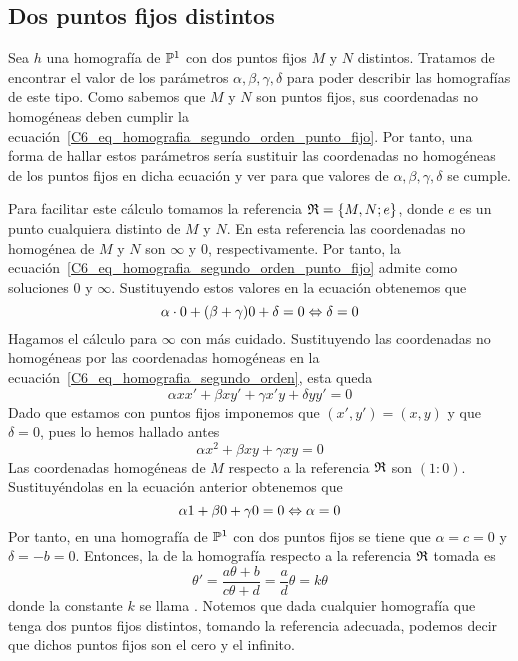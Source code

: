 \subsection{Dos puntos fijos distintos}
Sea $h$ una homografía de $\mathbb{P}^1$ con dos puntos fijos $M$ y $N$ distintos. Tratamos de encontrar el valor de los parámetros $\alpha, \beta,\gamma,\delta$ para poder describir las homografías de este tipo. Como sabemos que $M$ y $N$ son puntos fijos, sus coordenadas no homogéneas deben cumplir la ecuación~\eqref{C6_eq_homografia_segundo_orden_punto_fijo}. Por tanto, una forma de hallar estos parámetros sería sustituir las coordenadas no homogéneas de los puntos fijos en dicha ecuación y ver para que valores de $\alpha, \beta,\gamma,\delta$ se cumple. 

Para facilitar este cálculo tomamos la referencia $\mathfrak{R}=\{M,N;e\}$, donde $e$ es un punto cualquiera distinto de $M$ y $N$. En esta referencia las coordenadas no homogénea de $M$ y $N$ son $\infty$ y $0$, respectivamente. Por tanto, la ecuación~\eqref{C6_eq_homografia_segundo_orden_punto_fijo} admite como soluciones $0$ y $\infty$. Sustituyendo estos valores en la ecuación obtenemos que 
\begin{equation*}
	\alpha\cdot 0+(\beta+\gamma)0+\delta=0\Leftrightarrow\delta=0
\end{equation*}
Hagamos el cálculo para $\infty$ con más cuidado. Sustituyendo las coordenadas no homogéneas por las coordenadas homogéneas en la ecuación~\eqref{C6_eq_homografia_segundo_orden}, esta queda
\begin{equation}
	\alpha xx'+\beta xy'+\gamma x'y+\delta yy'=0
\end{equation}
Dado que estamos con puntos fijos imponemos que $(x',y')=(x,y)$ y que $\delta=0$, pues lo hemos hallado antes
\begin{equation*}
	\alpha x^2+\beta xy+\gamma xy=0
\end{equation*}
Las coordenadas homogéneas de $M$ respecto a la referencia $\mathfrak{R}$ son $(1:0)$. Sustituyéndolas en la ecuación anterior obtenemos que
\begin{equation*}
\alpha 1+\beta 0+\gamma 0=0\Leftrightarrow \alpha=0
\end{equation*}
Por tanto, en una homografía de $\mathbb{P}^1$ con dos puntos fijos se tiene que $\alpha=c=0$ y $\delta=-b=0$. Entonces, la  de la homografía respecto a la referencia $\mathfrak{R}$ tomada es
\begin{equation}
	\theta'=\frac{a\theta+b}{c\theta +d}=\frac{a}{d}\theta=k\theta
\end{equation}
donde la constante $k$ se llama . Notemos que dada cualquier homografía que tenga dos puntos fijos distintos, tomando la referencia adecuada, podemos decir que dichos puntos fijos son el cero y el infinito.

